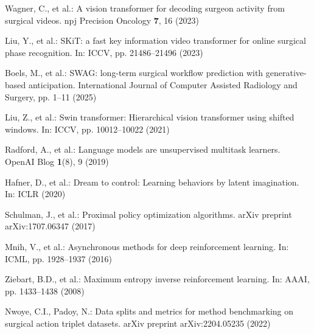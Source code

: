 \documentclass[runningheads]{llncs}
\begin{document}
\begin{thebibliography}{20}
Wagner, C., et al.: A vision transformer for decoding surgeon activity from surgical videos. npj Precision Oncology \textbf{7}, 16 (2023)

Liu, Y., et al.: SKiT: a fast key information video transformer for online surgical phase recognition. In: ICCV, pp. 21486--21496 (2023)

Boels, M., et al.: SWAG: long-term surgical workflow prediction with generative-based anticipation. International Journal of Computer Assisted Radiology and Surgery, pp. 1--11 (2025)

Liu, Z., et al.: Swin transformer: Hierarchical vision transformer using shifted windows. In: ICCV, pp. 10012--10022 (2021)

Radford, A., et al.: Language models are unsupervised multitask learners. OpenAI Blog \textbf{1}(8), 9 (2019)

Hafner, D., et al.: Dream to control: Learning behaviors by latent imagination. In: ICLR (2020)

Schulman, J., et al.: Proximal policy optimization algorithms. arXiv preprint arXiv:1707.06347 (2017)

Mnih, V., et al.: Asynchronous methods for deep reinforcement learning. In: ICML, pp. 1928--1937 (2016)

Ziebart, B.D., et al.: Maximum entropy inverse reinforcement learning. In: AAAI, pp. 1433--1438 (2008)

Nwoye, C.I., Padoy, N.: Data splits and metrics for method benchmarking on surgical action triplet datasets. arXiv preprint arXiv:2204.05235 (2022)
\end{thebibliography}
\end{document}
